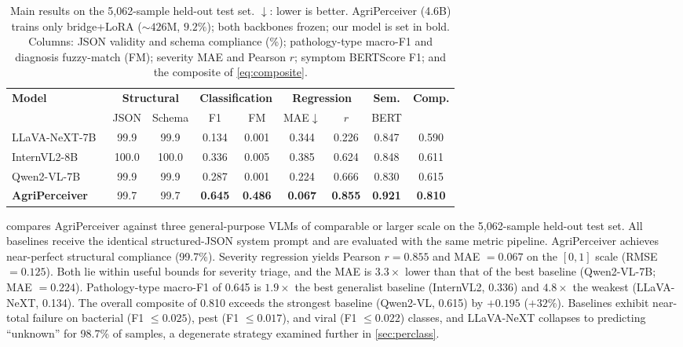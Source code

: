 \documentclass[runningheads]{llncs}
\newcommand{\ours}{AgriPerceiver}
\begin{document}
\begin{table}[t]
  \centering
  \caption{Main results on the 5,062-sample held-out test set.
    $\downarrow$: lower is better.
    \ours{} (4.6B) trains only bridge+LoRA (${\sim}426$M, $9.2\%$);
    both backbones frozen; our model is set in bold.
    Columns: JSON validity and schema compliance (\%); pathology-type
    macro-F1 and diagnosis fuzzy-match (FM); severity MAE and Pearson $r$;
    symptom BERTScore F1; and the composite of \cref{eq:composite}.}
  \label{tab:main}
  \setlength{\tabcolsep}{3pt}
  \footnotesize
  \begin{tabular}{@{}l cc cc cc c c@{}}
    \toprule
    \multirow{2}{*}{\textbf{Model}}
      & \multicolumn{2}{c}{\textbf{Structural}}
      & \multicolumn{2}{c}{\textbf{Classification}}
      & \multicolumn{2}{c}{\textbf{Regression}}
      & \textbf{Sem.}
      & \multirow{2}{*}{\textbf{Comp.}} \\
    \cmidrule(lr){2-3}\cmidrule(lr){4-5}\cmidrule(lr){6-7}\cmidrule(lr){8-8}
      & JSON & Schema
      & F1 & FM
      & MAE$\downarrow$ & $r$
      & BERT & \\
    \midrule
    LLaVA-NeXT-7B~\cite{liu2024llavanext}
      & 99.9 & 99.9 & 0.134 & 0.001 & 0.344 & 0.226 & 0.847 & 0.590 \\
    InternVL2-8B~\cite{chen2024internvl}
      & 100.0 & 100.0 & 0.336 & 0.005 & 0.385 & 0.624 & 0.848 & 0.611 \\
    Qwen2-VL-7B~\cite{wang2024qwen2vl}
      & 99.9 & 99.9 & 0.287 & 0.001 & 0.224 & 0.666 & 0.830 & 0.615 \\
    \midrule
    \textbf{\ours{}}
      & 99.7 & 99.7
      & \textbf{0.645} & \textbf{0.486}
      & \textbf{0.067} & \textbf{0.855}
      & \textbf{0.921} & \textbf{0.810} \\
    \bottomrule
  \end{tabular}
\end{table}

 compares \ours{} against three general-purpose VLMs
of comparable or larger scale on the 5,062-sample held-out test set. All baselines receive the identical structured-JSON system prompt and are evaluated with the same metric pipeline. \ours{} achieves near-perfect structural compliance (99.7\%).
Severity regression yields Pearson $r = 0.855$ and MAE $= 0.067$ on
the $[0,1]$ scale (RMSE $=0.125$). Both lie within useful bounds for
severity triage, and the MAE is $3.3\times$ lower than that of the best baseline
(Qwen2-VL-7B; MAE $= 0.224$).
Pathology-type macro-F1 of 0.645 is $1.9\times$ the best generalist baseline
(InternVL2, 0.336) and $4.8\times$ the weakest (LLaVA-NeXT, 0.134). The overall
composite of 0.810 exceeds the strongest baseline (Qwen2-VL, 0.615) by $+0.195$ (${+}32\%$).
Baselines exhibit near-total failure on bacterial (F1 $\leq 0.025$),
pest (F1 $\leq 0.017$), and viral (F1 $\leq 0.022$) classes, and
LLaVA-NeXT collapses to predicting ``unknown'' for 98.7\% of samples, a
degenerate strategy examined further in \cref{sec:perclass}.
\end{document}
